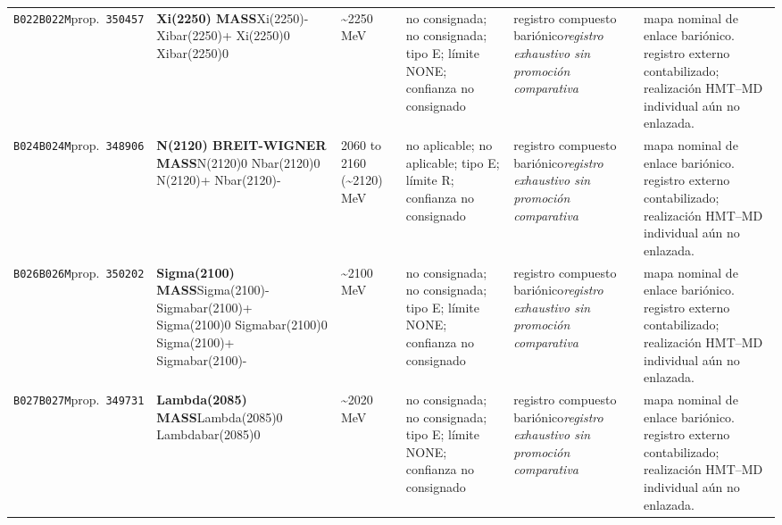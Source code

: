 \begin{landscape}
\begin{longtable}{L{1.85cm}L{4.45cm}L{2.35cm}L{4.05cm}L{3.35cm}L{7.15cm}}
\texttt{B022}\newline \texttt{B022M}\newline prop.\ \texttt{350457} & \textbf{Xi(2250) MASS}\newline Xi(2250)- \textbar{}\allowbreak{} Xibar(2250)+ \textbar{}\allowbreak{} Xi(2250)0 \textbar{}\allowbreak{} Xibar(2250)0 & \textasciitilde{}2250\,MeV & no consignada; no consignada; tipo E; límite NONE; confianza no consignado & registro compuesto bariónico\newline \emph{registro exhaustivo sin promoción comparativa} & mapa nominal de enlace bariónico. registro externo contabilizado; realización HMT--MD individual aún no enlazada. \\
\texttt{B024}\newline \texttt{B024M}\newline prop.\ \texttt{348906} & \textbf{N(2120) BREIT-WIGNER MASS}\newline N(2120)0 \textbar{}\allowbreak{} Nbar(2120)0 \textbar{}\allowbreak{} N(2120)+ \textbar{}\allowbreak{} Nbar(2120)- & 2060 to 2160 (\textasciitilde{}2120)\,MeV & no aplicable; no aplicable; tipo E; límite R; confianza no consignado & registro compuesto bariónico\newline \emph{registro exhaustivo sin promoción comparativa} & mapa nominal de enlace bariónico. registro externo contabilizado; realización HMT--MD individual aún no enlazada. \\
\texttt{B026}\newline \texttt{B026M}\newline prop.\ \texttt{350202} & \textbf{Sigma(2100) MASS}\newline Sigma(2100)- \textbar{}\allowbreak{} Sigmabar(2100)+ \textbar{}\allowbreak{} Sigma(2100)0 \textbar{}\allowbreak{} Sigmabar(2100)0 \textbar{}\allowbreak{} Sigma(2100)+ \textbar{}\allowbreak{} Sigmabar(2100)- & \textasciitilde{}2100\,MeV & no consignada; no consignada; tipo E; límite NONE; confianza no consignado & registro compuesto bariónico\newline \emph{registro exhaustivo sin promoción comparativa} & mapa nominal de enlace bariónico. registro externo contabilizado; realización HMT--MD individual aún no enlazada. \\
\texttt{B027}\newline \texttt{B027M}\newline prop.\ \texttt{349731} & \textbf{Lambda(2085) MASS}\newline Lambda(2085)0 \textbar{}\allowbreak{} Lambdabar(2085)0 & \textasciitilde{}2020\,MeV & no consignada; no consignada; tipo E; límite NONE; confianza no consignado & registro compuesto bariónico\newline \emph{registro exhaustivo sin promoción comparativa} & mapa nominal de enlace bariónico. registro externo contabilizado; realización HMT--MD individual aún no enlazada. \\

\end{longtable}
\end{landscape}
